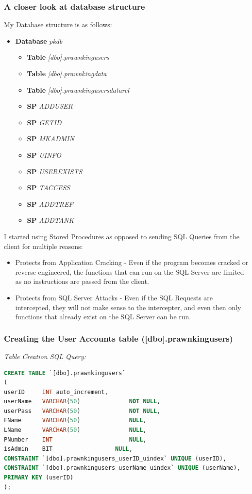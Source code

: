 \documentclass[a4paper,11pt]{proc}
\begin{document}
\subsubsection{A closer look at database structure}
My Database structure is as follows:
\begin{itemize}
    \item \textbf{Database} \textit{pkdb}
    \begin{itemize}
        \item \textbf{Table} \textit{[dbo].prawnkingusers}
        \item \textbf{Table} \textit{[dbo].prawnkingdata}
        \item \textbf{Table} \textit{[dbo].prawnkingusersdatarel}
        \item \textbf{SP} \textit{ADDUSER}
        \item \textbf{SP} \textit{GETID}
        \item \textbf{SP} \textit{MKADMIN}
        \item \textbf{SP} \textit{UINFO}
        \item \textbf{SP} \textit{USEREXISTS}
        \item \textbf{SP} \textit{TACCESS}
        \item \textbf{SP} \textit{ADDTREF}
        \item \textbf{SP} \textit{ADDTANK}
    \end{itemize}
\end{itemize}
I started using Stored Procedures as opposed to sending SQL Queries from the client for multiple reasons:

\begin{itemize}
    \item Protects from Application Cracking - Even if the program becomes cracked or reverse engineered, the functions that can run on the SQL Server are limited as no instructions are passed from the client.
    \item Protects from SQL Server Attacks - Even if the SQL Requests are intercepted, they will not make sense to the intercepter, and even then only functions that already exist on the SQL Server can be run.
\end{itemize}

\subsubsection{Creating the User Accounts table ([dbo].prawnkingusers)}
\textit{Table Creation SQL Query:}
\begin{lstlisting}[language=SQL,
deletekeywords={IDENTITY,INT},
morekeywords={clustered},    
framesep=10pt,
framextopmargin=10pt]
CREATE TABLE `[dbo].prawnkingusers`
(
userID     INT auto_increment,
userName   VARCHAR(50)              NOT NULL,
userPass   VARCHAR(50)              NOT NULL,
FName      VARCHAR(50)              NULL,
LName      VARCHAR(50)              NULL,
PNumber    INT                      NULL,
isAdmin    BIT		            NULL,
CONSTRAINT `[dbo].prawnkingusers_userID_uindex` UNIQUE (userID),
CONSTRAINT `[dbo].prawnkingusers_userName_uindex` UNIQUE (userName),
PRIMARY KEY (userID)
);
\end{lstlisting}
\end{document}
